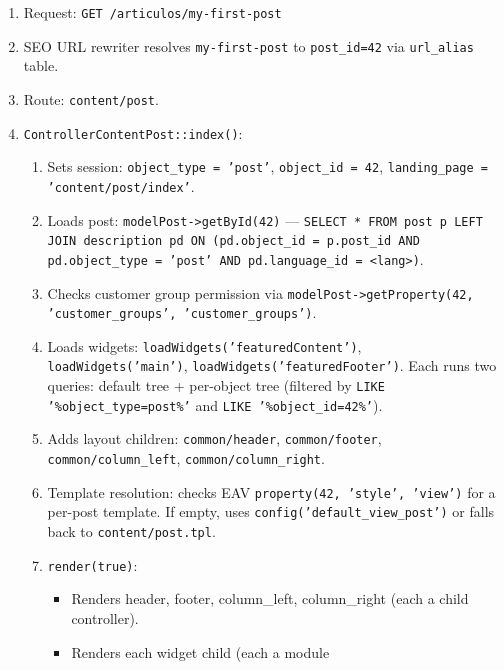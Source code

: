 \documentclass[11pt,a4paper]{article}
\begin{document}
\begin{enumerate}[leftmargin=1.6em,itemsep=2pt]
  \item Request: \texttt{GET /articulos/my-first-post}
  \item SEO URL rewriter resolves \texttt{my-first-post} to
        \texttt{post\_id=42} via \texttt{url\_alias} table.
  \item Route: \texttt{content/post}.
  \item \texttt{ControllerContentPost::index()}:
        \begin{enumerate}[itemsep=2pt]
          \item Sets session: \texttt{object\_type = 'post'},
                \texttt{object\_id = 42},
                \texttt{landing\_page = 'content/post/index'}.
          \item Loads post: \texttt{modelPost->getById(42)} ---
                \texttt{SELECT * FROM post p LEFT JOIN description pd ON
                (pd.object\_id = p.post\_id AND pd.object\_type = 'post'
                AND pd.language\_id = <lang>)}.
          \item Checks customer group permission via
                \texttt{modelPost->getProperty(42, 'customer\_groups',
                'customer\_groups')}.
          \item Loads widgets: \texttt{loadWidgets('featuredContent')},
                \texttt{loadWidgets('main')},
                \texttt{loadWidgets('featuredFooter')}. Each runs two
                queries: default tree + per-object tree (filtered by
                \texttt{LIKE '\%object\_type=post\%'} and
                \texttt{LIKE '\%object\_id=42\%'}).
          \item Adds layout children: \texttt{common/header},
                \texttt{common/footer},
                \texttt{common/column\_left},
                \texttt{common/column\_right}.
          \item Template resolution: checks EAV
                \texttt{property(42, 'style', 'view')} for a per-post
                template. If empty, uses \texttt{config('default\_view\_post')}
                or falls back to \texttt{content/post.tpl}.
          \item \texttt{render(true)}:
                \begin{itemize}[itemsep=2pt]
                  \item Renders header, footer, column\_left,
                        column\_right (each a child controller).
                  \item Renders each widget child (each a module

\end{itemize}
\end{enumerate}
\end{enumerate}
\end{document}
